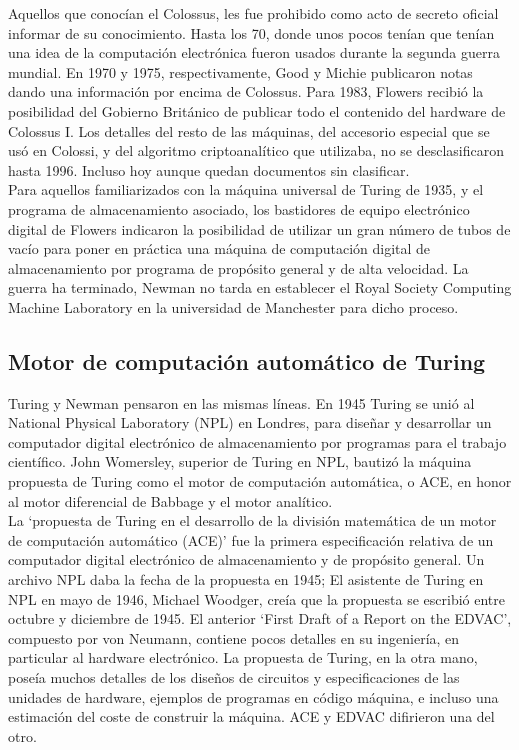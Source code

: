 \documentclass[a4paper]{article}
\begin{document}
    Aquellos que conocían el Colossus, les fue prohibido como acto de secreto oficial informar de su conocimiento. Hasta los 70, donde unos pocos tenían que tenían una idea de la computación electrónica fueron usados durante la segunda guerra mundial. En 1970 y 1975, respectivamente, Good y Michie publicaron notas dando una información por encima de Colossus. Para 1983, Flowers recibió la posibilidad del Gobierno Británico de publicar todo el contenido del hardware de Colossus I. Los detalles del resto de las máquinas, del accesorio especial  que se usó en Colossi,  y del algoritmo criptoanalítico que utilizaba, no se desclasificaron hasta 1996. Incluso hoy aunque quedan documentos sin clasificar.\\

    Para aquellos familiarizados con la máquina universal de Turing de 1935, y el programa de almacenamiento asociado, los bastidores de equipo electrónico digital de Flowers indicaron la posibilidad de utilizar un gran número de tubos de vacío para poner en práctica una máquina de computación digital de almacenamiento por programa de propósito general y de alta velocidad. La guerra ha terminado, Newman no tarda en establecer el  Royal Society Computing Machine Laboratory en la universidad de Manchester para dicho proceso.

    \subsection*{Motor de computación automático de Turing}

    Turing y Newman pensaron en las mismas líneas. En 1945 Turing se unió al National Physical Laboratory (NPL) en Londres, para diseñar y desarrollar un computador digital electrónico de almacenamiento por programas para el trabajo científico. John Womersley, superior de Turing en NPL, bautizó la máquina propuesta de Turing como el motor de computación automática, o ACE, en honor al motor diferencial de Babbage y el motor analítico.\\

    La ‘propuesta de Turing en el desarrollo de la división matemática de un motor de computación automático (ACE)’ fue la primera especificación relativa de un computador digital electrónico de almacenamiento y de propósito general. Un archivo NPL daba la fecha de la propuesta en 1945; El asistente de Turing en NPL en mayo de 1946, Michael Woodger,  creía que la propuesta se escribió entre octubre y diciembre de 1945.
    El anterior ‘First Draft of a Report on the EDVAC’, compuesto por von Neumann, contiene pocos detalles en su ingeniería, en particular al hardware electrónico. La propuesta de Turing, en la otra mano, poseía muchos detalles de los diseños de circuitos y especificaciones de las unidades de hardware, ejemplos de programas en código máquina, e incluso una estimación del coste de construir la máquina. ACE y EDVAC difirieron una del otro.\\
\end{document}
